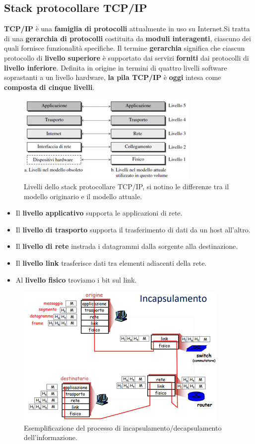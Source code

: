 \documentclass[11pt,a4paper]{article}
\theoremstyle{definition}
\begin{document}
\subsection{Stack protocollare TCP/IP}
\textbf{TCP/IP} è una \textbf{famiglia di protocolli} attualmente
in uso su Internet.\newline Si tratta di una \textbf{gerarchia di
	protocolli} costituita da \textbf{moduli interagenti}, ciascuno dei
quali fornisce funzionalità specifiche.
Il termine \textbf{gerarchia} significa che ciascun protocollo di
\textbf{livello superiore} è supportato dai servizi \textbf{forniti} dai
protocolli di \textbf{livello inferiore}.
Definita in origine in termini di quattro livelli software
soprastanti a un livello hardware, \textbf{la pila TCP/IP} è \textbf{oggi}
intesa come \textbf{composta} \textbf{di cinque livelli}.
\begin{figure}[!h]
	\includegraphics[scale=0.6]{Immagini/TCP_IP.png}
	\centering
	\caption{Livelli dello stack protocollare TCP/IP, si notino le differenze tra il modello originario e il modello attuale.}
\end{figure}
\begin{itemize}
	\item Il \textbf{livello applicativo} supporta le applicazioni di rete.
	\item Il \textbf{livello di trasporto} supporta il trasferimento di dati da un host all'altro.
	\item Il \textbf{livello di rete} instrada i datagrammi dalla sorgente alla destinazione.
	\item Il \textbf{livello link} trasferisce dati tra elementi adiacenti della rete.
	\item  Al \textbf{livello fisico} troviamo i bit sul link.
\end{itemize}
\begin{figure}[!h]
	\includegraphics[scale=0.5]{Immagini/Incapsulamento_m.png}
	\centering
	\caption{Esemplificazione del processo di incapsulamento/decapsulamento dell'informazione.}
\end{figure}
\end{document}
